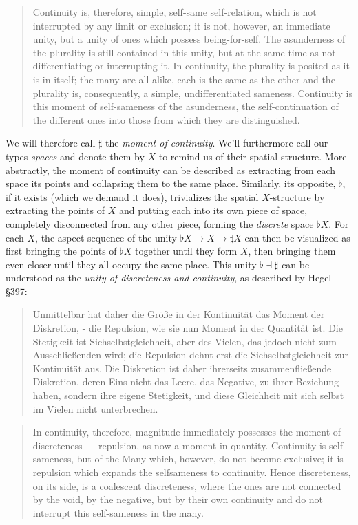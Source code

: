 \documentclass{article}
\begin{document}
\begin{quote}
    Continuity is, therefore, simple, self-same self-relation, which is not interrupted by any limit or exclusion; it is not, however, an immediate unity, but a unity of ones which possess being-for-self. The asunderness of the plurality is still contained in this unity, but at the same time as not differentiating or interrupting it. In continuity, the plurality is posited as it is in itself; the many are all alike, each is the same as the other and the plurality is, consequently, a simple, undifferentiated sameness. Continuity is this moment of self-sameness of the asunderness, the self-continuation of the different ones into those from which they are distinguished.
\end{quote}

We will therefore call $\sharp$ the \emph{moment of continuity}. We'll furthermore call our types 
\emph{spaces} and denote them by $X$ to remind us of their spatial structure. More abstractly, the moment of 
continuity can be described as extracting from each space its points and collapsing them to the same place. 
Similarly, its opposite, $\flat$, if it exists (which we demand it does), trivializes the spatial 
$X$-structure by extracting the points of $X$ and putting each into its own piece of space, completely disconnected 
from any other piece, forming the \emph{discrete} space $\flat X$. For each $X$, the aspect sequence of the 
unity $\flat X \rightarrow X \rightarrow \sharp X$ can then be visualized as first bringing the points of 
$\flat X$ together until they form $X$, then bringing them even closer until they all occupy the same place. 
This unity $\flat\dashv\sharp$ can be understood as the \emph{unity of discreteness and continuity}, as 
described by Hegel §397:

\begin{quote}
    Unmittelbar hat daher die Größe in der Kontinuität das Moment der Diskretion, - die Repulsion, wie sie nun Moment in der Quantität ist. Die Stetigkeit ist Sichselbstgleichheit, aber des Vielen, das jedoch nicht zum Ausschließenden wird; die Repulsion dehnt erst die Sichselbstgleichheit zur Kontinuität aus. Die Diskretion ist daher ihrerseits zusammenfließende Diskretion, deren Eins nicht das Leere, das Negative, zu ihrer Beziehung haben, sondern ihre eigene Stetigkeit, und diese Gleichheit mit sich selbst im Vielen nicht unterbrechen.
\end{quote}

\begin{quote}
    In continuity, therefore, magnitude immediately possesses the moment of discreteness — repulsion, as now a moment in quantity. Continuity is self-sameness, but of the Many which, however, do not become exclusive; it is repulsion which expands the selfsameness to continuity. Hence discreteness, on its side, is a coalescent discreteness, where the ones are not connected by the void, by the negative, but by their own continuity and do not interrupt this self-sameness in the many.
\end{quote}
\end{document}
